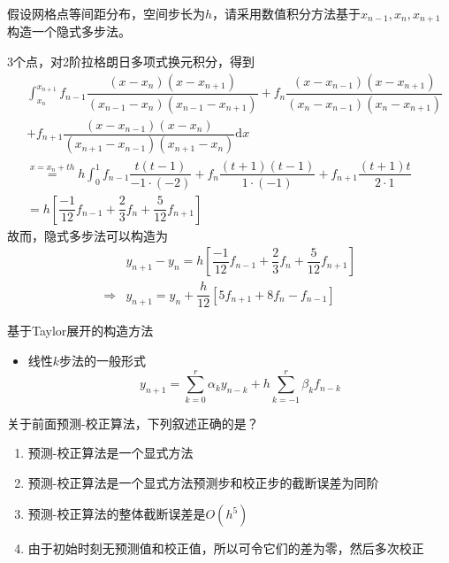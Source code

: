 \begin{example}
    假设网格点等间距分布，空间步长为$h$，请采用数值积分方法基于$x_{n-1},x_n,x_{n+1}$构造一个隐式多步法。
    \begin{solution}
        3个点，对2阶拉格朗日多项式换元积分，得到
        \[
            \begin{aligned}
                &\int_{x_{n}}^{x_{n+1}} f_{n-1}\dfrac{(x-x_{n})(x-x_{n+1})}{(x_{n-1}-x_{n})(x_{n-1}-x_{n+1})}+f_{n}\dfrac{(x-x_{n-1})(x-x_{n+1})}{(x_{n}-x_{n-1})(x_{n}-x_{n+1})}\\
                &+f_{n+1}\dfrac{(x-x_{n-1})(x-x_{n})}{(x_{n+1}-x_{n-1})(x_{n+1}-x_{n})} \mathrm{d}x\\
                &\overset{x = x_{n}+th}{=}h\int_{0}^{1}f_{n-1}\dfrac{t(t-1)}{-1\cdot (-2)}+f_{n}\dfrac{(t+1)(t-1)}{1\cdot (-1)}+f_{n+1}\dfrac{(t+1)t}{2\cdot 1}\\
                &=h\left[ \dfrac{-1}{12}f_{n-1} + \dfrac{2}{3}f_{n} + \dfrac{5}{12}f_{n+1} \right]
            \end{aligned}
        \]
        故而，隐式多步法可以构造为
        \[
            \begin{aligned}
                &y_{n+1}-y_n = h\left[ \dfrac{-1}{12}f_{n-1} + \dfrac{2}{3}f_{n} + \dfrac{5}{12}f_{n+1} \right]\\ 
                \Rightarrow & y_{n+1} = y_n + \dfrac{h}{12}\left[5f_{n+1} + 8f_{n}-f_{n-1}  \right]
            \end{aligned}
        \]
    \end{solution}
\end{example}
\begin{note}
    基于Taylor展开的构造方法

    \begin{itemize}
        \item 线性$k$步法的一般形式
        \[
            y_{n+1} = \sum_{k=0}^{r}\alpha_ky_{n-k}+h \sum_{k = -1}^{r}\beta_{k}f_{n-k}
        \]
    \end{itemize}
\end{note}

\begin{example}
    关于前面预测-校正算法，下列叙述正确的是？
    \begin{enumerate}
        \item [\choice{1}{A}] 预测-校正算法是一个显式方法
        \item [\choice{1}{B}] 预测-校正算法是一个显式方法预测步和校正步的截断误差为同阶
        \item [\choice{}{C}] 预测-校正算法的整体截断误差是$O(h^5)$
        \item [\choice{1}{D}] 由于初始时刻无预测值和校正值，所以可令它们的差为零，然后多次校正
    \end{enumerate}
\end{example}
